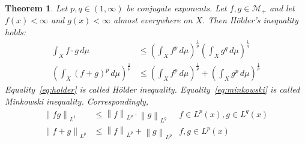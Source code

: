 \documentclass{article}
\newtheorem{theorem}{Theorem}  \numberwithin{theorem}{section}
\newcommand{\norm}[1]{\left\|#1\right\|}
\begin{document}
\begin{theorem}
  Let $p,q \in (1,\infty)$ be conjugate exponents.
  Let $f,g \in \mathcal M_+$ and let $f(x) < \infty$ and $g(x) < \infty$ almost everywhere on $X$. Then H\"older's inequality holds:
  \begin{align}
    \int_X f \cdot g \, d\mu &\leq \left(\int_X f^p \, d\mu\right)^{\frac1p} \left(\int_X g^q \, d\mu\right)^{\frac1q} \label{eq:holder} \\
    \left(\int_X (f + g)^p \, d\mu\right)^{\frac1p} &\leq \left(\int_X f^p \, d\mu\right)^{\frac1p} + \left(\int_X g^p \, d\mu\right)^{\frac1p} \label{eq:minkowski}
  \end{align}
  Equality~\ref{eq:holder} is called H\"older inequality. Equality~\ref{eq:minkowski} is called Minkowski inequality.
  Correspondingly,
  \begin{align*}
    \norm{fg}_{L^1} &\leq \norm{f}_{L^p} \cdot \norm{g}_{L^q}   & f \in L^p(x), g \in L^q(x) \\
    \norm{f+g}_{L^p} &\leq \norm{f}_{L^p} + \norm{g}_{L^p}      & f,g \in L^p(x)
  \end{align*}
\end{theorem}
\end{document}
